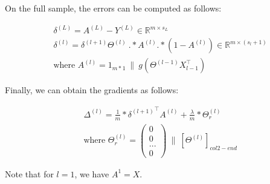 \documentclass[a4paper, 12pt]{article}
\begin{document}
On the full sample, the errors can be computed as follows:

\begin{align*}
& \delta^{(L)} = A^{(L)} - Y^{(L)} \in \mathbb{R}^{m\times s_{L}} \\
& \delta^{(l)} =  \delta^{(l+1)} \Theta^{(l)} \: .* A^{(l)} .* (1-A^{(l)}) \in \mathbb{R}^{m\times (s_{l}+1)} \\
& \text{where } A^{(l)} = 1_{m*1} \: \| \: g(\Theta^{(l-1)}X_{l-1}^{\top}) 
\end{align*}

Finally, we can obtain the gradients as follows:

\begin{align*}
& \Delta^{(l)} = \frac{1}{m} * {\delta^{(l+1)}}^{\top}A^{(l)}  + \frac{\lambda}{m} * \Theta_{r}^{(l)} \\
& \text{where } \Theta_{r}^{(l)} = \begin{pmatrix} 0 \\ 0 \\ ... \\ 0 \end{pmatrix} \: \| \: \left[\Theta^{(l)}\right]_{col 2-end}
\end{align*}

Note that for $l=1$, we have $A^{1}=X$.
\end{document}
